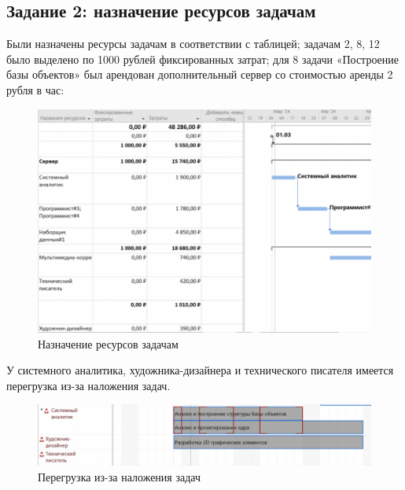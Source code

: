 \subsection*{Задание 2: назначение ресурсов задачам}

Были назначены ресурсы задачам в соответствии с таблицей; задачам 2, 8, 12
было выделено по 1000 рублей фиксированных затрат; для 8 задачи
«Построение базы объектов» был арендован дополнительный сервер со
стоимостью аренды 2 рубля в час:

\begin{figure}[h!]
	\begin{center}
		\includegraphics[scale=0.5]{inc/img/p_4.png}
	\end{center}
	\captionsetup{justification=centering}
	\caption{Назначение ресурсов задачам}
	\label{fig:u3}
\end{figure}

У системного аналитика, художника-дизайнера и технического писателя
имеется перегрузка из-за наложения задач.

\begin{figure}[h!]
	\begin{center}
		\includegraphics[scale=0.4]{inc/img/p_5.png}
	\end{center}
	\captionsetup{justification=centering}
	\caption{Перегрузка из-за наложения задач}
	\label{fig:u3}
\end{figure}

